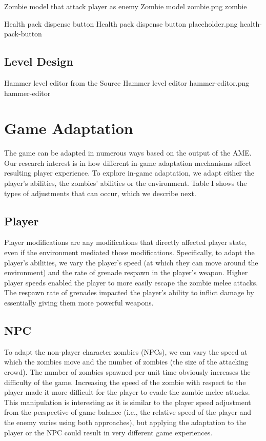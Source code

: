 \largeimg
{Zombie model that attack player as enemy}
{Zombie model}
{zombie.png}
{zombie}

\largeimg
{Health pack dispense button}
{Health pack dispense button}
{placeholder.png}
{health-pack-button}

\subsection{Level Design}

\largeimg
{Hammer level editor from the Source}
{Hammer level editor}
{hammer-editor.png}
{hammer-editor}

\section{Game Adaptation}
The game can be adapted in numerous ways based on the output of the AME. Our research interest is in how different in-game adaptation mechanisms affect resulting player experience. To explore in-game adaptation, we adapt either the player's abilities, the zombies' abilities or the environment. Table I shows the types of adjustments that can occur, which we describe next.

\subsection{Player}
Player modifications are any modifications that directly affected player state, even if the environment mediated those modifications. Specifically, to adapt the player’s abilities, we vary the player’s speed (at which they can move around the environment) and the rate of grenade respawn in the player’s weapon. Higher player speeds enabled the player to more easily escape the zombie melee attacks. The respawn rate of grenades impacted the player’s ability to inflict damage by essentially giving them more powerful weapons.

\subsection{NPC}
To adapt the non-player character zombies (NPCs), we can vary the speed at which the zombies move and the number of zombies (the size of the attacking crowd). The number of zombies spawned per unit time obviously increases the difficulty of the game. Increasing the speed of the zombie with respect to the player made it more difficult for the player to evade the zombie melee attacks. This manipulation is interesting as it is similar to the player speed adjustment from the perspective of game balance (i.e., the relative speed of the player and the enemy varies using both approaches), but applying the adaptation to the player or the NPC could result in very different game experiences.

